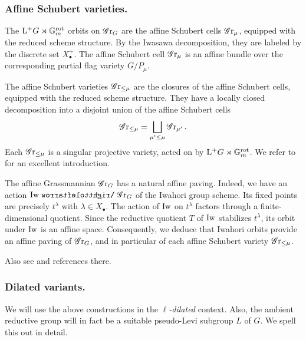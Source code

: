 \subsubsection{Affine Schubert varieties.}
The $\mathrm{L^+} G \rtimes \mathbb{G}_m^{\mathrm{rot}}$ orbits on $\operatorname{\mathscr{G}r}_G$ are the affine Schubert cells $\operatorname{\mathscr{G}r}_{\mu}$, equipped with the reduced scheme structure. By the Iwasawa decomposition, they are labeled by the discrete set $X^{+}_{\bullet}$. The affine Schubert cell $\operatorname{\mathscr{G}r}_{\mu}$ is an affine bundle over the corresponding partial flag variety $G/P_{\mu}$.

The affine Schubert varieties $\operatorname{\mathscr{G}r}_{\leq \mu}$ are the closures of the affine Schubert cells, equipped with the reduced scheme structure. They have a locally closed decomposition into a disjoint union of the affine Schubert cells
\begin{equation*}
    \operatorname{\mathscr{G}r}_{\leq \mu} = \bigsqcup_{\mu' \leq \mu} \operatorname{\mathscr{G}r}_{\mu'}.
\end{equation*}
Each $\operatorname{\mathscr{G}r}_{\leq \mu}$ is a singular projective variety, acted on by $\mathrm{L^+} G \rtimes \mathbb{G}_m^{\mathrm{rot}}$. We refer to \cite{Zhu15} for an excellent introduction.

\begin{remark}
The affine Grassmannian $\operatorname{\mathscr{G}r}_{G}$ has a natural affine paving. Indeed, we have an action $\Iw \acts \Gr_{G}$ of the Iwahori group scheme. Its fixed points are precisely $t^{\lambda}$ with $\lambda \in X_{\bullet}$. The action of $\operatorname{\mathrm{Iw}}$ on $t^{\lambda}$ factors through a finite-dimensional quotient. Since the reductive quotient $T$ of $\operatorname{\mathrm{Iw}}$ stabilizes $t^{\lambda}$, its orbit under $\operatorname{\mathrm{Iw}}$ is an affine space. Consequently, we deduce that Iwahori orbits provide an affine paving of $\operatorname{\mathscr{G}r}_G$, and in particular of each affine Schubert variety $\operatorname{\mathscr{G}r}_{\leq \mu}$. 

Also see \cite[(5.2)]{HHH05} and references there.
\end{remark}




\subsubsection{Dilated variants.}\label{subsubsection: dilated variants}
We will use the above constructions in the \textit{$\ell$-dilated} context. Also, the ambient reductive group will in fact be a suitable pseudo-Levi subgroup $L$ of $G$. We spell this out in detail.

